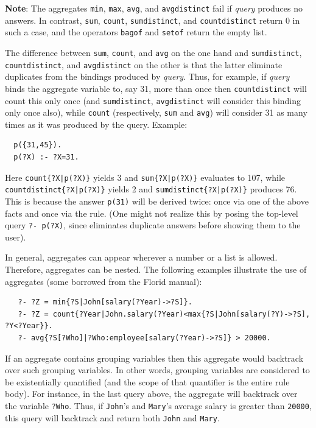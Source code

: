 \documentclass[11pt]{article}
\newcommand{\ERGO}{\mbox{\smaller{\ensuremath{\cal{E}}\smaller{{\sc{RGO}}}}}\xspace}
\newcommand{\FLSYSTEM}{\ERGO}
\newcommand{\FLORID}{{\mbox{\sc Florid}}\xspace}
\begin{document}
\textbf{Note}: 
The aggregates {\tt min}, {\tt max}, {\tt avg}, and \texttt{avgdistinct}  
fail if \emph{query}  produces no answers.
In contrast, \texttt{sum}, \texttt{count}, \texttt{sumdistinct}, and
\texttt{countdistinct} return 0 in such a case, and the operators
{\tt bagof} and {\tt setof}
return the empty list.

The difference between \texttt{sum}, \texttt{count}, and \texttt{avg} on
the one hand and \texttt{sumdistinct}, \texttt{countdistinct}, and
\texttt{avgdistinct} on the other is that the latter eliminate duplicates
from the bindings produced by \textit{query}. Thus, for example, if
\textit{query} binds the aggregate variable to, say 31, more than once then
\texttt{countdistinct} will count this only once (and \texttt{sumdistinct},
\texttt{avgdistinct} will consider this binding only once also), while   
\texttt{count} (respectively, \texttt{sum} and \texttt{avg}) will consider    
31 as many times as it was produced by the query. Example:
\begin{verbatim}
  p({31,45}).
  p(?X) :- ?X=31.
\end{verbatim}
Here \texttt{count\{?X|p(?X)\}} yields 3 and \texttt{sum\{?X|p(?X)\}}
evaluates to 107, while \texttt{countdistinct\{?X|p(?X)\}} yields 2 and
\texttt{sumdistinct\{?X|p(?X)\}} produces 76.  This is because the answer
\texttt{p(31)} will be derived twice: once via one of the above facts and
once via the rule. (One might not realize this by posing the top-level
query \texttt{?- p(?X)}, since \FLSYSTEM eliminates duplicate answers
before showing them to the user).

In general, aggregates can appear wherever a number or a list is
allowed. Therefore, aggregates can be nested. The following examples
illustrate the use of aggregates (some borrowed from the \FLORID manual):
\begin{verbatim}
   ?- ?Z = min{?S|John[salary(?Year)->?S]}.
   ?- ?Z = count{?Year|John.salary(?Year)<max{?S|John[salary(?Y)->?S], ?Y<?Year}}.
   ?- avg{?S[?Who]|?Who:employee[salary(?Year)->?S]} > 20000. 
\end{verbatim}
If an aggregate contains grouping variables 
then this aggregate would backtrack over such
grouping variables. In other words, grouping variables are considered to be
existentially quantified (and the scope of that quantifier is
the entire rule body).
For instance, in the last query above, the
aggregate will backtrack over the variable {\tt ?Who}. Thus, if
{\tt John}'s and {\tt Mary}'s average salary is greater than {\tt 20000},
this query will backtrack and return both {\tt John} and {\tt Mary}.
\end{document}

